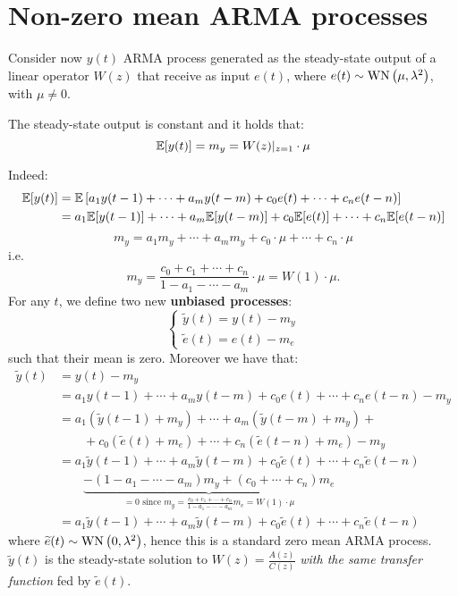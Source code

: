 \section{Non-zero mean ARMA processes}\label{sec:non-zero-mean-arma}
Consider now $y(t)$ ARMA process generated as the steady-state output of a linear operator $W(z)$ that receive as input $e(t)$, where $e(t) \sim \operatorname{WN}\left(\mu, \lambda^{2}\right)$, with $\mu\neq0$.

\begin{theorem}\label{thm:gain-theorem}
	The steady-state output is constant and it holds that:
	\[
		\mathbb{E}[y(t)]=m_{y}=W(z)|_{z=1} \cdot \mu
	\]
\end{theorem}

Indeed:
\begin{align*}
		\mathbb{E}[y(t)] &=\mathbb{E}\left[a_{1} y(t-1)+\cdots+a_{m} y(t-m)+c_{0} e(t)+\cdots+c_{n} e(t-n)\right] \\
		&=a_{1} \mathbb{E}[y(t-1)]+\cdots+a_{m} \mathbb{E}[y(t-m)]+c_{0} \mathbb{E}[e(t)]+\cdots+c_{n} \mathbb{E}[e(t-n)]
\end{align*}
$$
m_{y}=a_{1} m_{y}+\cdots+a_{m} m_{y}+c_{0} \cdot \mu+\cdots+c_{n} \cdot \mu
$$
i.e.
\[
	m_{y}=\frac{c_{0}+c_{1}+\cdots+c_{n}}{1-a_{1}-\cdots-a_{m}} \cdot \mu=W(1) \cdot \mu.
\]
For any $t$, we define two new \textbf{unbiased processes}:
$$
\boxed{
	\begin{cases}
		\tilde{y}(t)=y(t)-m_{y}\\
		\tilde{e}(t)=e(t)-m_{e}
	\end{cases}
}
$$
such that their mean is zero. Moreover we have that:
\begin{align*}
	\tilde{y}(t)&= y(t)-m_{y}\\
	&= a_{1} y(t-1)+\cdots+a_{m} y(t-m)+c_{0} e(t)+\cdots+c_{n} e(t-n)-m_{y} \\
	&= a_{1}\left(\tilde{y}(t-1)+m_{y}\right)+\cdots+a_{m }\left(\tilde{y}(t-m)+m_{y}\right)+\\
	&\qquad +c_{0}\left(\tilde{e}(t)+m_{e}\right)+\cdots+c_{n}\left(\tilde{e}(t-n)+m_{e}\right)-m_{y} \\
	&= a_{1} \tilde{y}(t-1)+\cdots+a_{m} \tilde{y}(t-m)+c_{0} \tilde{e}(t)+\cdots+c_{n} \tilde{e}(t-n) \\
	&\qquad \underbrace{-\left(1-a_{1}-\cdots-a_{m}\right) m_{y}+\left(c_{0}+\cdots + c_{n}\right) m_{e}}_{=0\text { since } m_{y}=\frac{c_{0}+c_{1}+\cdots+c_{n}}{1-a_{1}-\cdots-a_{m }} m_{e}=W(1) \cdot \mu} \\
	&=a_{1} \tilde{y}(t-1)+\cdots+a_{m} \tilde{y}(t-m)+c_{0} \tilde{e}(t)+\cdots+c_{n} \tilde{e}(t-n)
\end{align*}
where $\widetilde{e}(t)\sim \operatorname{WN}\left(0, \lambda^{2}\right)$, hence this is a standard zero mean ARMA process. $\tilde{y}(t)$ is the steady-state solution to $W(z)=\frac{A(z)}{C(z)}$ \emph{with the same transfer function} fed by $\tilde{e}(t)$.


